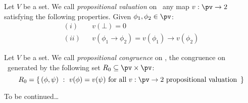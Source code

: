 \begin{defin}\label{logic:def:FOPL:propcong:prop:valuation}
Let $V$ be a set. We call {\em propositional valuation} on \pv\ any
map $v:\pv\to 2$ satisfying the following properties. Given
$\phi_{1},\phi_{2}\in\pv$:
    \begin{eqnarray*}
    (i)&&v(\bot)=0\\
    (ii)&&v(\phi_{1}\to\phi_{2})=v(\phi_{1})\to v(\phi_{2})
    \end{eqnarray*}
\end{defin}
\begin{defin}\label{logic:def:FOPL:propcong:prop:congruence}
Let $V$ be a set. We call {\em propositional congruence} on \pv, the
congruence on \pv\ generated by the following set $R_{0}\subseteq
\pv\times\pv$:
    \[
    R_{0}=\left\{\,(\phi,\psi)\ :\ v(\phi)=v(\psi)\mbox{\ for all
    $v:\pv\to 2$ propositional valuation\ }
    \,\right\}
    \]
\end{defin}
To be continued\ldots
